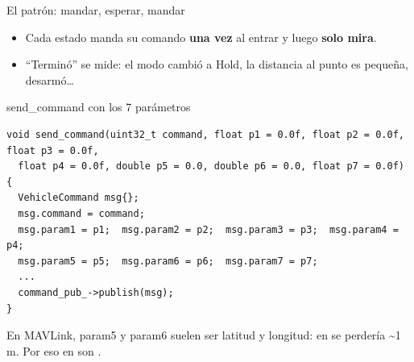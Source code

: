 \begin{frame}{El patrón: mandar, esperar, mandar}
  \centering
  \vspace{0.6em}
  \begin{itemize}\small
    \item Cada estado manda su comando \textbf{una vez} al entrar y luego \textbf{solo mira}.
    \item ``Terminó'' se mide: el modo cambió a Hold, la distancia al punto es pequeña, desarmó\ldots
  \end{itemize}
\end{frame}

\begin{frame}[fragile]{send\_command con los 7 parámetros}
  \begin{lstlisting}[style=cpp,caption={goto\_mission.cpp: param5 y param6 son double}]
void send_command(uint32_t command, float p1 = 0.0f, float p2 = 0.0f, float p3 = 0.0f,
  float p4 = 0.0f, double p5 = 0.0, double p6 = 0.0, float p7 = 0.0f)
{
  VehicleCommand msg{};
  msg.command = command;
  msg.param1 = p1;  msg.param2 = p2;  msg.param3 = p3;  msg.param4 = p4;
  msg.param5 = p5;  msg.param6 = p6;  msg.param7 = p7;
  ...
  command_pub_->publish(msg);
}
  \end{lstlisting}
  \small En MAVLink, param5 y param6 suelen ser latitud y longitud: en  se perdería
  \textasciitilde1 m. Por eso en  son .
\end{frame}

